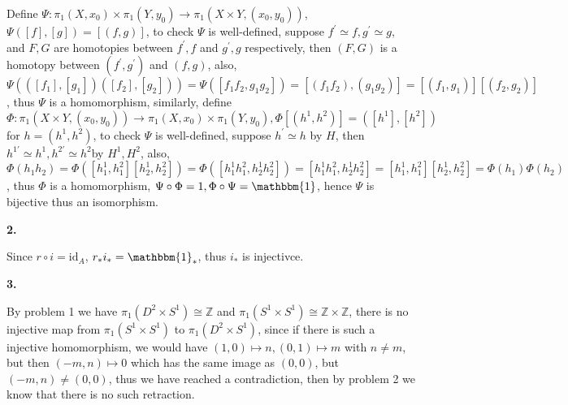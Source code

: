 \documentclass[../main.tex]{subfiles}
\begin{document}
Define $\Psi:\pi_{1}(X,x_{0})\times\pi_{1}(Y,y_{0})\rightarrow \pi_{1}\left(X\times Y,(x_{0},y_{0})\right)$, $\Psi([f],[g])=[(f,g)]$, to check $\Psi$ is well-defined, suppose $f^{'}\simeq f, g^{'}\simeq g$, and $F,G$ are homotopies between $f^{'},f$ and $g^{'},g$ respectively, then $(F,G)$ is a homotopy between $(f^{'},g^{'})$ and \((f,g)\), also, $\Psi\left(([f_{1}],[g_{1}])([f_{2}],[g_{2}])\right)=\Psi\left([f_{1}f_{2},g_{1}g_{2}]\right)=[(f_{1}f_{2}),(g_{1}g_{2})]=[(f_{1},g_{1})][(f_{2},g_{2})]$, thus $\Psi$ is a homomorphism, similarly, define $\Phi: \pi_{1}\left(X\times Y,(x_{0},y_{0})\right) \rightarrow \pi_{1}(X,x_{0})\times\pi_{1}(Y,y_{0}), \Phi[(h^{1},h^{2})]=([h^{1}],[h^{2}])$ for $h=(h^{1},h^{2})$, to check $\Psi$ is well-defined, suppose $h^{'}\simeq h$ by $H$, then $h^{1'}\simeq h^{1},h^{2'}\simeq h^{2}$by $H^{1},H^{2}$, also, $\Phi(h_{1}h_{2})=\Phi\left([h_{1}^{1},h_{1}^{2}][h_{2}^{1},h_{2}^{2}]\right)=\Phi\left([h_{1}^{1}h_{1}^{2},h_{2}^{1}h_{2}^{2}]\right)=[h_{1}^{1}h_{1}^{2},h_{2}^{1}h_{2}^{2}]=[h_{1}^{1},h_{1}^{2}][h_{2}^{1},h_{2}^{2}]=\Phi(h_{1})\Phi(h_{2})$, thus $\Phi$ is a homomorphism, $\Psi\circ\Phi=1,\Phi\circ\Psi=\mathbbm{1}$, hence $\Psi$ is bijective thus an isomorphism. \par
\textbf{2.} \par
Since $r\circ i=\mathrm{id}_{A}$, $r_{*}i_{*}=\mathbbm{1}_{*}$, thus $i_{*}$ is injectivce. \par
\textbf{3.} \par
By problem 1 we have $\pi_{1}(D^{2}\times S^{1}) \cong \mathbb{Z}$ and $\pi_{1}(S^{1}\times S^{1}) \cong \mathbb{Z}\times \mathbb{Z}$, there is no injective map from $\pi_{1}(S^{1}\times S^{1})$ to $\pi_{1}(D^{2}\times S^{1})$, since if there is such a injective homomorphism, we would have $(1,0)\mapsto n, (0,1)\mapsto m $ with $n\neq m$, but then \((-m,n)\mapsto 0\) which has the same image as $(0,0)$, but $(-m,n)\neq (0,0)$, thus we have reached a contradiction, then by problem 2 we know that there is no such retraction.
\end{document}
